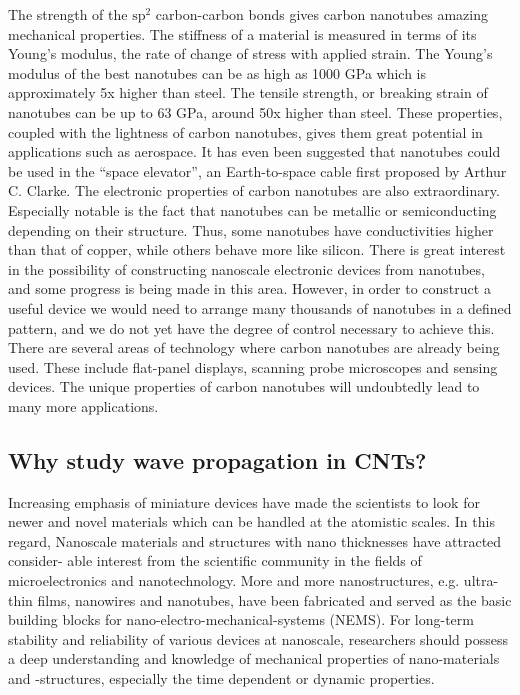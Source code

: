 The strength of the $\mathrm{sp^2}$ carbon-carbon bonds gives carbon nanotubes amazing mechanical properties. The stiffness of a material is measured in terms of its Young's modulus, the rate of change of stress with applied strain. The Young's modulus of the best nanotubes can be as high as 1000 GPa which is approximately 5x higher than steel. The tensile strength, or breaking strain of nanotubes can be up to 63 GPa, around 50x higher than steel. These properties, coupled with the lightness of carbon nanotubes, gives them great potential in applications such as aerospace. It has even been suggested that nanotubes could be used in the “space elevator”, an Earth-to-space cable first proposed by Arthur C. Clarke. The electronic properties of carbon nanotubes are also extraordinary. Especially notable is the fact that nanotubes can be metallic or semiconducting depending on their structure. Thus, some nanotubes have conductivities higher than that of copper, while others behave more like silicon. There is great interest in the possibility of constructing nanoscale electronic devices from nanotubes, and some progress is being made in this area. However, in order to construct a useful device we would need to arrange many thousands of nanotubes in a defined pattern, and we do not yet have the degree of control necessary to achieve this. There are several areas of technology where carbon nanotubes are already being used. These include flat-panel displays, scanning probe microscopes and sensing devices. The unique properties of carbon nanotubes will undoubtedly lead to many more applications.\cite{importance}
\subsection {Why study wave propagation in CNTs?}
Increasing emphasis of miniature devices have made the scientists to look for newer
and novel materials which can be handled at the atomistic scales. In this regard,
Nanoscale materials and structures with nano thicknesses have attracted consider-
able interest from the scientific community in the fields of microelectronics and
nanotechnology. More and more nanostructures, e.g. ultra-thin films, nanowires
and nanotubes, have been fabricated and served as the basic building blocks for
nano-electro-mechanical-systems (NEMS). For long-term stability and reliability of
various devices at nanoscale, researchers should possess a deep understanding and
knowledge of mechanical properties of nano-materials and -structures, especially the
time dependent or dynamic properties.

